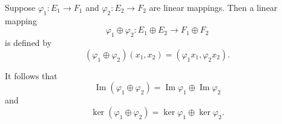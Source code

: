 Suppose $\varphi_1: E_1 \to F_1$ and $\varphi_2: E_2 \to F_2$ are linear mappings. Then a linear mapping
$$\varphi_1 \oplus \varphi_2: E_1 \oplus E_2 \to F_1 \oplus F_2$$
is defined by
$$(\varphi_1 \oplus \varphi_2)(x_1, x_2) = (\varphi_1 x_1, \varphi_2 x_2).$$

It follows that
$$\operatorname{Im}(\varphi_1 \oplus \varphi_2) = \operatorname{Im} \varphi_1 \oplus \operatorname{Im} \varphi_2$$
and
$$\ker(\varphi_1 \oplus \varphi_2) = \ker \varphi_1 \oplus \ker \varphi_2.$$
